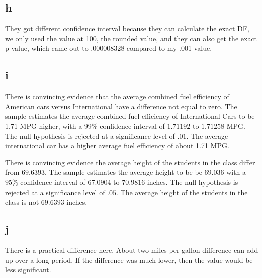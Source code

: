 \documentclass[10pt,letterpaper]{article}
\begin{document}
\subsection*{h}
They got different confidence interval because they can calculate the exact DF,
we only used the value at 100, the rounded value, and they can also get the
exact p-value, which came out to .000008328 compared to my .001 value.

\subsection*{i}
There is convincing evidence that the average combined fuel efficiency of American
cars versus International have a difference not equal to zero. The sample estimates
the average combined fuel efficiency of International Cars to be 1.71 MPG higher,
with a 99\% confidence interval of $1.71192$ to $1.71258$ MPG. The null hypothesis
is rejected at a significance level of $.01$. The average international car has
a higher average fuel efficiency of about 1.71 MPG. 

There is convincing evidence the average height of the students in the
class differ from $69.6393$. The sample estimates the average height to be be 
$69.036$ with a $95\%$ confidence interval of $67.0904$ to $70.9816$ inches. The
null hypothesis is rejected at a significance level of $.05$. The average
height of the students in the class is not $69.6393$ inches.


\subsection*{j}
There is a practical difference here. About two miles per gallon difference
can add up over a long period. If the difference was much lower, then the value
would be less significant.
\end{document}
